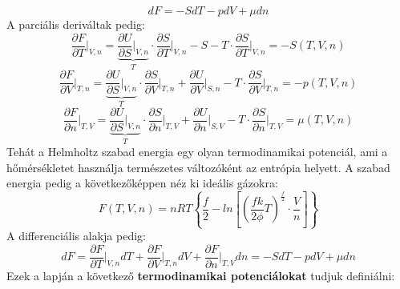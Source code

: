 \documentclass[a4paper,12pt]{article}
\begin{document}
\begin{equation}
    dF = - S dT - p dV + \mu dn
\end{equation}
A parciális deriváltak pedig:
\begin{equation}
    \frac{\partial F}{\partial T}\bigg|_{V,n} = \underbrace{\frac{\partial U}{\partial S}\bigg|_{V,n}}_{T} \cdot \frac{\partial S}{\partial T}\bigg|_{V,n} - S - T \cdot \frac{\partial S}{\partial T}\bigg|_{V,n} = - S(T, V, n)
\end{equation}
\begin{equation}
    \frac{\partial F}{\partial V}\bigg|_{T,n} = \underbrace{\frac{\partial U}{\partial S}\bigg|_{V,n}}_{T} \cdot \frac{\partial S}{\partial V}\bigg|_{T,n} + \frac{\partial U}{\partial V}\bigg|_{S,n} - T \cdot \frac{\partial S}{\partial V}\bigg|_{T,n} = - p(T, V, n)
\end{equation}
\begin{equation}
    \frac{\partial F}{\partial n}\bigg|_{T,V} = \underbrace{\frac{\partial U}{\partial S}\bigg|_{V,n}}_{T} \cdot \frac{\partial S}{\partial n}\bigg|_{T,V} + \frac{\partial U}{\partial n}\bigg|_{S,V} - T \cdot \frac{\partial S}{\partial n}\bigg|_{T,V} = \mu(T, V, n)
\end{equation}
Tehát a Helmholtz szabad energia egy olyan termodinamikai potenciál, ami a hőmérsékletet használja természetes változóként az entrópia helyett. 
A szabad energia pedig a következőképpen néz ki ideális gázokra:
\begin{equation}
    F(T, V, n) = n R T \left\{\frac{f}{2} - ln \left[\left(\frac{fk}{2\phi}T\right)^{\frac{f}{2}}\cdot \frac{V}{n} \right]\right\}
\end{equation}
A differenciális alakja pedig:
\begin{equation}
    dF = \frac{\partial F}{\partial T}\bigg|_{V,n} dT + \frac{\partial F}{\partial V}\bigg|_{T,n} dV + \frac{\partial F}{\partial n}\bigg|_{T,V} dn = - S dT - p dV + \mu dn
\end{equation}
\newline
\newline
Ezek a lapján a következő \textbf{termodinamikai potenciálokat} tudjuk definiálni:
\end{document}
